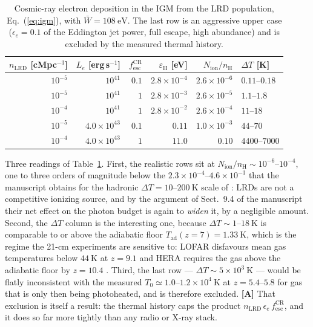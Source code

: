 \documentclass[11pt,a4paper]{article}
\begin{document}
\begin{table}[t]\centering\small
\caption{Cosmic-ray electron deposition in the IGM from the LRD population,
Eq.~(\ref{eq:igm}), with $\bar W=108\ \mathrm{eV}$. The last row is an
aggressive upper case ($\epsilon_e=0.1$ of the Eddington jet power, full escape,
high abundance) and is excluded by the measured thermal history.}
\label{tab:igm}
\begin{tabular}{@{}rrrrrl@{}}
\toprule
$n_{\mathrm{LRD}}$ [cMpc$^{-3}$] & $L_e$ [erg\,s$^{-1}$] &
$f_{\mathrm{esc}}^{\mathrm{CR}}$ & $\varepsilon_{\mathrm H}$ [eV] &
$N_{\mathrm{ion}}/n_{\mathrm H}$ & $\Delta T$ [K] \\
\midrule
$10^{-5}$ & $10^{41}$            & $0.1$ & $2.8\times10^{-4}$ & $2.6\times10^{-6}$ & $0.11$--$0.18$ \\
$10^{-5}$ & $10^{41}$            & $1$   & $2.8\times10^{-3}$ & $2.6\times10^{-5}$ & $1.1$--$1.8$ \\
$10^{-4}$ & $10^{41}$            & $1$   & $2.8\times10^{-2}$ & $2.6\times10^{-4}$ & $11$--$18$ \\
$10^{-5}$ & $4.0\times10^{43}$   & $0.1$ & $0.11$             & $1.0\times10^{-3}$ & $44$--$70$ \\
$10^{-4}$ & $4.0\times10^{43}$   & $1$   & $11.0$             & $0.10$             & $4400$--$7000$ \\
\bottomrule
\end{tabular}
\end{table}

Three readings of Table~\ref{tab:igm}. First, the realistic rows sit at
$N_{\mathrm{ion}}/n_{\mathrm H}\sim10^{-6}$--$10^{-4}$, one to three orders of
magnitude below the $2.3\times10^{-4}$--$4.6\times10^{-3}$ that the manuscript
obtains for the hadronic $\Delta T=10$--$200\ \mathrm{K}$ scale of
\citet{Leite2017}: LRDs are not a competitive ionizing source, and by the
argument of Sect.~9.4 of the manuscript their net effect on the photon budget
\citep{Munoz2024} is again to \emph{widen} it, by a negligible amount. Second,
the $\Delta T$ column is the interesting one, because $\Delta T\sim1$--$18\
\mathrm{K}$ is comparable to or above the adiabatic floor
$T_{\mathrm{ad}}(z=7)=1.33\ \mathrm{K}$, which is the regime the 21-cm
experiments are sensitive to: LOFAR disfavours mean gas temperatures below
$44\ \mathrm{K}$ at $z=9.1$ \citep{Mertens2025,Ghara2025} and HERA requires the
gas above the adiabatic floor by $z=10.4$ \citep{HERA2023}. Third, the last row
--- $\Delta T\sim5\times10^{3}\ \mathrm{K}$ --- would be flatly inconsistent
with the measured $T_0\simeq1.0$--$1.2\times10^{4}\ \mathrm{K}$ at
$z=5.4$--$5.8$ \citep{Gaikwad2020} for gas that is only then being photoheated,
and is therefore excluded. \textbf{[A]} That exclusion is itself a result: the
thermal history caps the product
$n_{\mathrm{LRD}}\,\epsilon_e\,f_{\mathrm{esc}}^{\mathrm{CR}}$, and it does so
far more tightly than any radio or X-ray stack.
\end{document}
